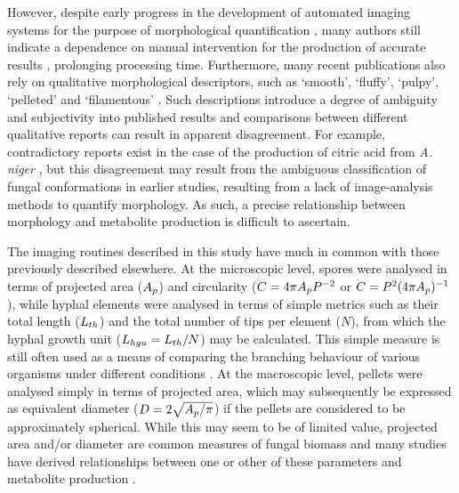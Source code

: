 However, despite early progress in the development of automated imaging systems for the purpose of morphological quantification \cite{packer1990,tucker1992}, many authors still indicate a dependence on manual intervention for the production of accurate results \cite{mcintyre1998, wongwicharn1999a,lubbehusen2004,anikster2005,rahardjo2005b,lecault2007,elsabbagh2008}, prolonging processing time. Furthermore, many recent publications also rely on qualitative morphological descriptors, such as \lq smooth', \lq fluffy', \lq pulpy', \lq pelleted' and \lq filamentous' \cite{domingues2000,znidarsic2000,ahamed2005}. Such descriptions introduce a degree of ambiguity and subjectivity into published results and comparisons between different qualitative reports can result in apparent disagreement. For example, contradictory reports exist in the case of the production of citric acid from \emph{A. niger} \cite{kisser1980,paul1999}, but this disagreement may result from the ambiguous classification of fungal conformations in earlier studies, resulting from a lack of image-analysis methods to quantify morphology. As such, a precise relationship between morphology and metabolite production is difficult to ascertain.

The imaging routines described in this study have much in common with those previously described elsewhere. At the microscopic level, spores were analysed in terms of projected area ($A_p$) and circularity ($C=4 \pi A_p P^{-2}$ or $C=P^2 (4 \pi A_p)^{-1}$), while hyphal elements were analysed in terms of simple metrics such as their total length ($L_{th}$) and the total number of tips per element ($N$), from which the hyphal growth unit ($L_{hgu} = L_{th} / N$) may be calculated. This simple measure is still often used as a means of comparing the branching behaviour of various organisms under different conditions \cite{elsabbagh2006,kubo2007,bizukojc2006,papagianni2006b,papagianni2006a}. At the macroscopic level, pellets were analysed simply in terms of projected area, which may subsequently be expressed as equivalent diameter ($D=2\sqrt{A_p / \pi}$) if the pellets are considered to be approximately spherical. While this may seem to be of limited value, projected area and/or diameter are common measures of fungal biomass and many studies have derived relationships between one or other of these parameters and metabolite production \cite{xu2000,jppark2002,couri2003,elenshasy2006,papagianni2006a}.

